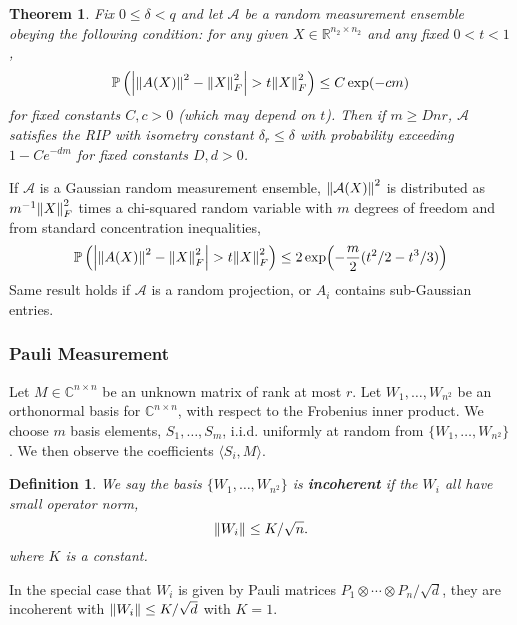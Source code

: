 \documentclass[10pt]{article}  %
\theoremstyle{plain}
\newtheorem{theorem}{Theorem}[section]
\newtheorem{definition}[thm]{Definition}
\numberwithin{equation}{section}
\newcommand{\innerp}[1]{\langle{#1}\rangle}
\def\mA{\mathcal{A}}
\def\R{\mathbb{R}}
\def\C{\mathbb{C}}
\renewcommand{\R}{\mathbb{R}}
\renewcommand{\C}{\mathbb{C}}
\begin{document}
\begin{theorem}\cite[Theorem 2.3]{candesTightOracleBounds}
	Fix $0 \leq \delta < q$ and let $\mA$ be a random measurement ensemble obeying the following condition: for any given $X \in \R^{n_2 \times n_2}$ and any fixed $0 < t < 1$, 
	\begin{equation}
		\mathbb{P}\left(\abs{\norm{A(X)}^2 - \norm{X}^2_F} > t \norm{X}^2_F\right) \leq C\exp(-cm)
	\end{equation}
	for fixed constants $C, c > 0$ (which may depend on $t$). Then if $m \geq Dnr$, $\mA$ satisfies the RIP with isometry constant $\delta_r \leq \delta$ with probability exceeding $1 - Ce^{-dm}$ for fixed constants $D, d >0$. 
\end{theorem}

If $\mA$ is a Gaussian random measurement ensemble, $\norm{\mA(X)}^2$ is distributed as $m^{-1}\norm{X}^2_F$ times a chi-squared random variable with $m$ degrees of freedom and from standard concentration inequalities, \\
\begin{equation}
	\mathbb{P}\left(\abs{\norm{A(X)}^2 - \norm{X}^2_F} > t \norm{X}^2_F\right) \leq 2\exp(-\frac{m}{2}(t^2/2 - t^3/3))
\end{equation}
Same result holds if $\mA$ is a random projection, or $A_i$ contains sub-Gaussian entries.

\subsubsection{Pauli Measurement}
Let $M\in \C^{n \times n}$ be an unknown matrix of rank at most $r$. Let $W_1, \dots, W_{n^2}$ be an orthonormal basis for $\C^{n \times n}$, with respect to the Frobenius inner product. We choose $m$ basis elements, $S_1, \dots, S_m$, i.i.d. uniformly at random from $\{W_1, \dots, W_{n^2}\}$. We then observe the coefficients $\innerp{S_i, M}$. 

\begin{definition}
	We say the basis $\{W_1, \dots, W_{n^2}\}$ is \textbf{incoherent} if the $W_i$ all have small operator norm, \\
	\begin{equation}
		\norm{W_i} \leq K/\sqrt{n}.
	\end{equation}
	where $K$ is a constant. 
\end{definition}

In the special case that $W_i$ is given by Pauli matrices $P_1 \otimes \cdots \otimes P_n/\sqrt{d}$, they are incoherent with $\norm{W_i} \leq K/\sqrt d$ with $K = 1$. 
\end{document}
